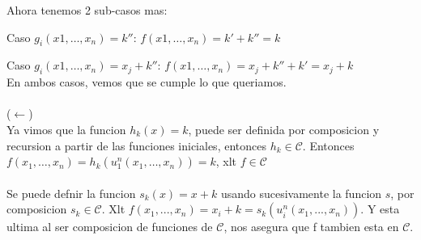 \documentclass{report}
\begin{document}
Ahora tenemos 2 sub-casos mas:

Caso $g_i(x1, \ldots, x_n) = k''$:  $f(x1, \ldots, x_n) = k' + k'' = k$

Caso $g_i(x1, \ldots, x_n) = x_j + k''$: $f(x1, \ldots, x_n) = x_j + k'' + k' = x_j + k$
\\
En ambos casos, vemos que se cumple lo que queriamos.
\\\\

($\leftarrow$)\\
Ya vimos que la funcion $h_k(x) = k$, puede ser definida por composicion y recursion a partir de
las funciones iniciales, entonces $h_k \in \mathcal{C}$.
Entonces $f(x_1 , \ldots , x_n) = h_k(u_1^n(x_1 , \ldots , x_n)) = k$, xlt $f \in \mathcal{C}$
\\\\
Se puede defnir la funcion $s_k(x) = x + k$ usando sucesivamente la funcion $s$, por composicion $s_k \in \mathcal{C}$.
Xlt $f(x_1, ... , x_n) = x_i  + k = s_k(u_i^n(x_1, ... , x_n))$. Y esta ultima al ser composicion de funciones de
$\mathcal{C}$, nos asegura que f tambien esta en $\mathcal{C}$.





\qs{}{}
\qs{}{}
\qs{}{}
\qs{}{}
\qs{}{}
\qs{}{}
\qs{}{}
\end{document}
